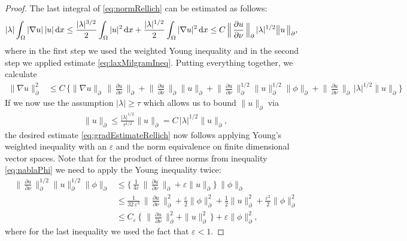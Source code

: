 \begin{proof}
  The last integral of \eqref{eq:normRellich} can be estimated as follows:
  \begin{align}
\label{eq:lambdaNablaU}
    |\lambda| \int_\Omega |\nabla u| \, |u| \, {\operatorname{d}\!{x}} 
    &\leq  \frac{|\lambda|^{3/2}}{2} \int_\Omega |u|^2 \, {\operatorname{d}\!{x}} + \frac{|\lambda|^{1/2}}{2 } \int_\Omega |\nabla u|^2 \, {\operatorname{d}\!{x}} \leq C \, \Big\| \, \frac{\partial u}{\partial \nu} \, \Big\|_\partial \, |\lambda|^{1/2}  \big\| u\,\big\|_\partial, 
  \end{align}
  where in the first step we used the weighted Young inequality and in the second step we applied estimate \eqref{eq:laxMilgramIneq}.
  Putting everything together, we calculate
  \begin{align*}
    \| \nabla u\|_\partial^2 
    &\leq C\, \bigg\{ \| \nabla u\|_\partial \, \Big\|\,\frac{\partial u}{\partial \nu} \, \Big\|_\partial 
    + \Big\|\,\frac{\partial u}{\partial \nu}\,\Big\|_\partial \|u\|^{}_\partial 
    + \Big\|\,\frac{\partial u}{\partial \nu}\,\Big\|_\partial^{1/2} \|u\|_\partial^{1/2} \|\phi\|^{}_\partial 
+ \Big\|\,\frac{\partial u}{\partial \nu}\,\Big\|_\partial \, |\lambda|^{1/2} \big\|  u \big\|^{}_\partial\bigg\}
  \end{align*}
  If we now use the assumption $|\lambda| \geq \tau$ which allows us to bound $\|u\|_\partial$ via
  \begin{align*}
      \|u\|^{}_\partial \leq \frac{|\lambda|^{1/2}}{\tau^{1/2}} \|u\|^{}_\partial = C \, |\lambda|^{1/2} \|u\|^{}_{\partial},
  \end{align*}
  the desired estimate \eqref{eq:gradEstimateRellich} now follows applying Young's weighted inequality with an $\varepsilon$ and the norm equivalence on finite dimensional vector spaces. 
  Note that for the product of three norms from inequality \eqref{eq:nablaPhi} we need to apply the Young inequality twice:
  \begin{align*}
      \Big\| \, \frac{\partial u}{\partial \nu} \, \Big\|_\partial^{1/2} \|u\|_\partial^{1/2} \|\phi\|^{}_\partial 
      &\leq \Big\{\, \frac{1}{4 \varepsilon}\, \Big\|\, \frac{\partial u}{\partial \nu}\, \Big\|^{}_\partial 
  + \varepsilon \|u\|^{}_\partial \Big\} \, \|\phi\|^{}_\partial  \\[0.5em]
  &\leq \frac{1}{32\, \varepsilon^3} \, \Big\|\, \frac{\partial u}{\partial \nu} \, \Big\|_\partial^2 + \frac{\varepsilon}{2} \|\phi\|_\partial^2 + \frac{1}{2} \|u\|_\partial^2 + \frac{\varepsilon^2}{2} \|\phi\|_\partial^2 \\[0.5em]
  &\leq C_\varepsilon\, \Big\{ \; \Big\|\, \frac{\partial u}{\partial\nu} \, \Big\|_\partial^2 + \|u\|_\partial^2 \,\Big\} + \varepsilon \|\phi\|_\partial^2,
  \end{align*}
  where for the last inequality we used the fact that $\varepsilon < 1$.


\end{proof}
